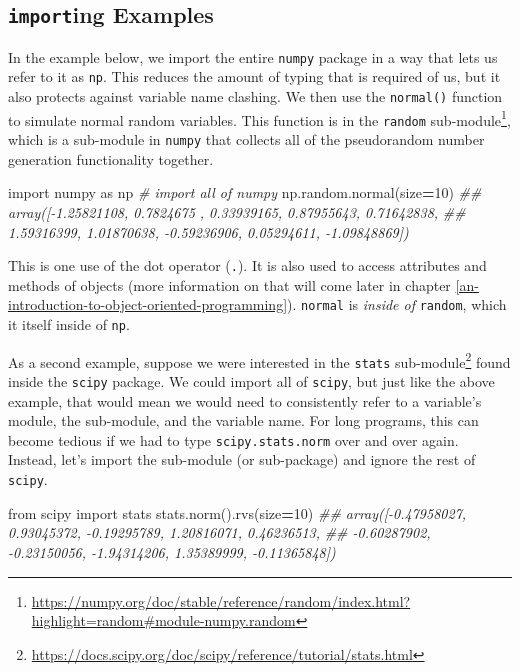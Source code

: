 \documentclass[
  12pt,
  krantz2]{krantz}
\makeatletter
\newenvironment{Shaded}{\begin{snugshade}}{\end{snugshade}}
\newcommand{\CommentTok}[1]{\textcolor[rgb]{0.37,0.37,0.37}{\textit{#1}}}
\newcommand{\DecValTok}[1]{\textcolor[rgb]{0.06,0.06,0.06}{#1}}
\newcommand{\ImportTok}[1]{#1}
\newcommand{\NormalTok}[1]{#1}
\newcommand{\OperatorTok}[1]{\textcolor[rgb]{0.43,0.43,0.43}{\textbf{#1}}}
\renewcommand{\href}[2]{#2\footnote{\url{#1}}}
\newenvironment{kframe}{%
\medskip{}
\setlength{\fboxsep}{.8em}
 \def\at@end@of@kframe{}%
 \ifinner\ifhmode%
  \def\at@end@of@kframe{\end{minipage}}%
  \begin{minipage}{\columnwidth}%
 \fi\fi%
 \def\FrameCommand##1{\hskip\@totalleftmargin \hskip-\fboxsep
 \colorbox{shadecolor}{##1}\hskip-\fboxsep
     \hskip-\linewidth \hskip-\@totalleftmargin \hskip\columnwidth}%
 \MakeFramed {\advance\hsize-\width
   \@totalleftmargin\z@ \linewidth\hsize
   \@setminipage}}%
 {\par\unskip\endMakeFramed%
 \at@end@of@kframe}
\renewenvironment{Shaded}{\begin{kframe}}{\end{kframe}}
\makeatother
\begin{document}
\hypertarget{importing-examples}{%
\subsection{\texorpdfstring{\texttt{import}ing Examples}{importing Examples}}\label{importing-examples}}

In the example below, we import the entire \texttt{numpy} package in a way that lets us refer to it as \texttt{np}. This reduces the amount of typing that is required of us, but it also protects against variable name clashing. We then use the \texttt{normal()} function to simulate normal random variables. This function is in the \href{https://numpy.org/doc/stable/reference/random/index.html?highlight=random\#module-numpy.random}{\texttt{random} sub-module}, which is a sub-module in \texttt{numpy} that collects all of the pseudorandom number generation functionality together.

\begin{Shaded}
\begin{Highlighting}[]
\ImportTok{import}\NormalTok{ numpy }\ImportTok{as}\NormalTok{ np }\CommentTok{\# import all of numpy}
\NormalTok{np.random.normal(size}\OperatorTok{=}\DecValTok{10}\NormalTok{)}
\CommentTok{\#\# array([{-}1.25821108,  0.7824675 ,  0.33939165,  0.87955643,  0.71642838,}
\CommentTok{\#\#         1.59316399,  1.01870638, {-}0.59236906,  0.05294611, {-}1.09848869])}
\end{Highlighting}
\end{Shaded}

This is one use of the dot operator (\texttt{.}). It is also used to access attributes and methods of objects (more information on that will come later in chapter \ref{an-introduction-to-object-oriented-programming}). \texttt{normal} is \emph{inside of} \texttt{random}, which it itself inside of \texttt{np}.

As a second example, suppose we were interested in the \href{https://docs.scipy.org/doc/scipy/reference/tutorial/stats.html}{\texttt{stats} sub-module} found inside the \texttt{scipy} package. We could import all of \texttt{scipy}, but just like the above example, that would mean we would need to consistently refer to a variable's module, the sub-module, and the variable name. For long programs, this can become tedious if we had to type \texttt{scipy.stats.norm} over and over again. Instead, let's import the sub-module (or sub-package) and ignore the rest of \texttt{scipy}.

\begin{Shaded}
\begin{Highlighting}[]
\ImportTok{from}\NormalTok{ scipy }\ImportTok{import}\NormalTok{ stats}
\NormalTok{stats.norm().rvs(size}\OperatorTok{=}\DecValTok{10}\NormalTok{)}
\CommentTok{\#\# array([{-}0.47958027,  0.93045372, {-}0.19295789,  1.20816071,  0.46236513,}
\CommentTok{\#\#        {-}0.60287902, {-}0.23150056, {-}1.94314206,  1.35389999, {-}0.11365848])}
\end{Highlighting}
\end{Shaded}
\end{document}
